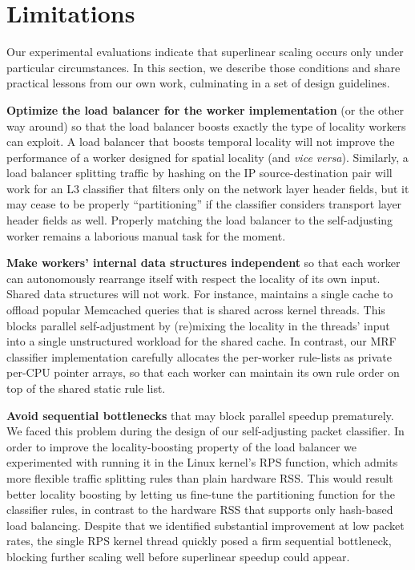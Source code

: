 \section{Limitations}
\label{sec:discussion}

Our experimental evaluations indicate that superlinear scaling occurs only under particular circumstances. In this section, we describe those conditions and share practical lessons from our own work, culminating in a set of design guidelines.

\noindent%
\textbf{Optimize the load balancer for the worker implementation} (or the other way around) so that the load balancer boosts exactly the type of locality workers can exploit. A load balancer that boosts temporal locality will not improve the performance of a worker designed for spatial locality (and \emph{vice versa}). Similarly, a load balancer splitting traffic by hashing on the IP source-destination pair will work for an L3 classifier that filters only on the network layer header fields, but it may cease to be properly ``partitioning'' if the classifier considers transport layer header fields as well. Properly matching the load balancer to the self-adjusting worker remains a laborious manual task for the moment.

\noindent%
\textbf{Make workers' internal data structures independent} so that each worker can autonomously rearrange itself with respect the locality of its own input. Shared data structures will not work. For instance, \cite{ghigoff2021bmc} maintains a single cache to offload popular Memcached queries that is shared across kernel threads. This blocks parallel self-adjustment by (re)mixing the locality in the threads' input into a single unstructured workload for the shared cache. In contrast, our MRF classifier implementation carefully allocates the per-worker rule-lists as private per-CPU pointer arrays, so that each worker can maintain its own rule order on top of the shared static rule list.

\noindent%
\textbf{Avoid sequential bottlenecks} that may block parallel speedup prematurely. We faced this problem during the design of our self-adjusting packet classifier. In order to improve the locality-boosting property of the load balancer we experimented with running it in the Linux kernel's RPS function, which admits more flexible traffic splitting rules than plain hardware RSS. This would result better locality boosting by letting us fine-tune the partitioning function for the classifier rules, in contrast to the hardware RSS that supports only hash-based load balancing. Despite that we identified substantial improvement at low packet rates, the single RPS kernel thread quickly posed a firm sequential bottleneck, blocking further scaling well before superlinear speedup could appear.

